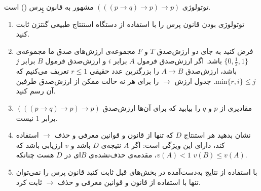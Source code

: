 توتولوژی
$(((p\to q)\to p)\to p)$
مشهور به قانون پِرس
()
است.
\begin{enumerate}[label=(\alph*)]
\item
توتولوژی بودن قانون پرس را با استفاده از دستگاه استنتاج طبیعی گنتزن ثابت کنید.
\item
فرض کنید به جای دو ارزش‌صدق $T$ و $F$ مجموعه‌ی ارزش‌های صدق ما مجموعه‌ی $\{0,\frac{1}{2},1\}$ باشد. اگر ارزش‌صدق فرمول $A$ برابر $i$ و ارزش‌صدق فرمول $B$ برابر $j$ باشد، ارزش‌صدق $A\to B$ را بزرگترین عدد حقیقی $r\leq 1$ تعریف می‌کنیم که
$\text{min}\{r,i\}\leq j$.
جدول ارزش $\to$ را برای هر نه حالت ممکن از ارزش‌صدق طرفین آن رسم کنید.
\item
مقادیری از $p$ و $q$ را بیابید که برای آن‌ها ارزش‌صدق $(((p\to q)\to p)\to p)$ برابر $1$ نیست.
\item
نشان بدهید هر استنتاج $D$ که تنها از قانون
و قوانین معرفی و حذف $\to$ استفاده کند، دارای این ویژگی است: اگر $A$ نتیجه‌ی $D$ باشد و $v$ ارزیابی باشد که $v(A)<1$، مقدمه‌ی حذف‌نشده‌ی $B$ای در $D$ هست چنانکه $v(B)\leq v(A)$.
\item
با استفاده از نتایج به‌دست‌آمده در بخش‌های قبل ثابت کنید قانون پرس را نمی‌توان تنها با استفاده از قانون
و قوانین معرفی و حذف $\to$ ثابت کرد.
\end{enumerate}\quad
